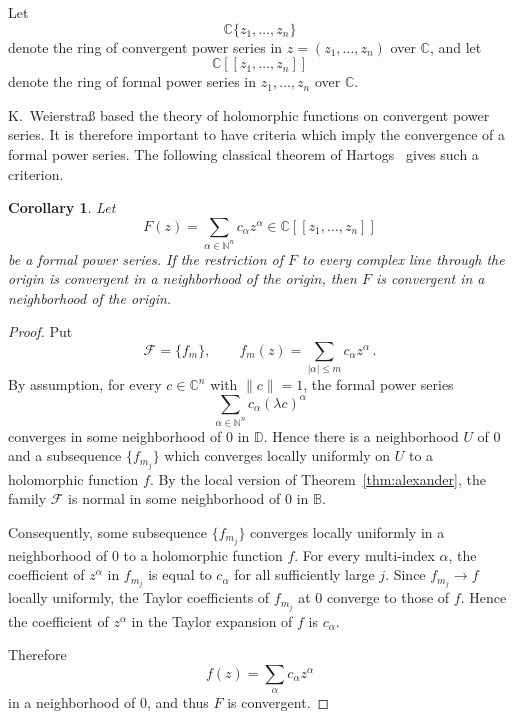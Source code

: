 \documentclass[pdflatex]{sn-jnl}%
\newtheorem{cor}[thm]{Corollary}
\theoremstyle{definition}
\theoremstyle{remark}
\numberwithin{equation}{section}
\newcommand{\C}{\mathbb{C}}
\newcommand{\D}{\mathbb{D}}
\begin{document}
    Let
    \[
        \C\{z_1,\ldots,z_n\}
    \]
    denote the ring of convergent power series in $z=(z_1,\ldots,z_n)$ over $\C$, and let
    \[
        \C[[z_1,\ldots,z_n]]
    \]
    denote the ring of formal power series in $z_1,\ldots,z_n$ over $\C$.

    K.~Weierstra\ss{} based the theory of holomorphic functions on convergent power series.
    It is therefore important to have criteria which imply the convergence of a formal power series.
    The following classical theorem of Hartogs~\cite{MR1511365} gives such a criterion.

    \begin{cor}
        \label{cor:hartogs}
        Let
        \[
            F(z)=\sum_{\alpha\in\mathbb{N}^n}c_\alpha z^\alpha \in\C[[z_1,\ldots,z_n]]
        \]
        be a formal power series.
        If the restriction of $F$ to every complex line through the origin is convergent in a neighborhood of the origin, then $F$ is convergent in a neighborhood of the origin.
    \end{cor}

    \begin{proof}
        Put
        \[
            \mathcal{F}=\{f_m\}, \qquad f_m(z)=\sum_{|\alpha|\leq m}c_\alpha z^\alpha\,.
        \]
        By assumption, for every $c\in\C^n$ with $\lVert c\rVert=1$, the formal power series
        \[
            \sum_{\alpha\in\mathbb{N}^n}c_\alpha(\lambda c)^\alpha
        \]
        converges in some neighborhood of $0$ in $\D$.
        Hence there is a neighborhood $U$ of $0$ and a subsequence $\{f_{m_j}\}$ which converges locally uniformly on $U$ to a holomorphic function $f$.
        By the local version of Theorem~\ref{thm:alexander}, the family $\mathcal{F}$ is normal in some neighborhood of $0$ in $\mathbb{B}$.

        Consequently, some subsequence $\{f_{m_j}\}$ converges locally uniformly in a neighborhood of $0$ to a holomorphic function $f$.
        For every multi-index $\alpha$, the coefficient of $z^\alpha$ in $f_{m_j}$ is equal to $c_\alpha$ for all sufficiently large $j$.
        Since $f_{m_j}\to f$ locally uniformly, the Taylor coefficients of $f_{m_j}$ at $0$ converge to those of $f$.
        Hence the coefficient of $z^\alpha$ in the Taylor expansion of $f$ is $c_\alpha$.

        Therefore
        \[
            f(z)=\sum_\alpha c_\alpha z^\alpha
        \]
        in a neighborhood of $0$, and thus $F$ is convergent.
    \end{proof}
\end{document}
